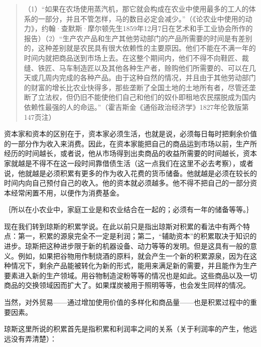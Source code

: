 \begin{quote}{（1）“如果在农场使用蒸汽机，那它就会构成在农业中使用最多的工人的体系的一部分，并且不管怎样，马的数目必定会减少。”（《论农业中使用的动力》，约翰·查默斯·摩尔顿先生1859年12月7日在艺术和手工业协会所作的报告）（2）“生产农产品和生产其他劳动部门的产品所需要的时间是有差别的，这种差别就是农民具有很大依赖性的主要原因。他们不能在不满一年的时间内就把商品送到市场上去。在这整个期间内，他们不得不向鞋匠、裁缝、铁匠、马车制造匠以及其他各种生产者，赊购他们所需要的、可以在几天或几周内完成的各种产品。由于这种自然的情况，并且由于其他劳动部门的财富的增长比农业快得多，那些垄断了全国土地的土地所有者，尽管还垄断了立法权，但仍旧不能使他们自己和他们的奴仆即租地农民摆脱成为国内依赖性最强的人的命运。”（霍吉斯金《通俗政治经济学》1827年伦敦版第147页注）}\end{quote}

资本家和资本的区别在于，资本家必须生活，也就是说，必须每日每时把剩余价值的一部分作为收入来消费。因此，在资本家能把自己的商品运到市场以前，生产所经历的时间越长，或者说，他从市场得到出卖商品的收益所需要的时间越长，资本家就越是不得不在这一段时间靠借债生活（这一点我们在这里不必去考察），或者说，他就越是必须积累有更多的作为收入花费的货币储备。他就越是必须在较长的时间内向自己预付自己的收入。他的资本就必须越多。他不得不把自己的一部分资本经常闲置不用，以便作为消费基金。

｛所以在小农业中，家庭工业是和农业结合在一起的；必须有一年的储备等等。｝


现在我们转到琼斯的积累学说。在此以前只是指出琼斯对积累的看法中有两个特点：第一，积累的源泉完全不一定是利润；第二，“辅助资本”的积累取决于知识的进步。琼斯把这种进步限于新的机器设备、动力等等的发明。但是这具有一般的意义。例如，如果把谷物用作制烧酒的原料，就会产生一个新的积累源泉，因为在这种情况下，剩余产品能被转化为新的形式，能用来满足新的需要，并且能作为生产要素进入新的生产领域。用谷物制造淀粉等等的情况也是如此。这些商品以及一切商品的交换领域因而扩大了。如果煤炭被用于照明等等，也会发生同样的情况。

当然，对外贸易——通过增加使用价值的多样化和商品量——也是积累过程中的重要因素。

琼斯这里所说的积累首先是指积累和利润率之间的关系（关于利润率的产生，他远远没有弄清楚）：

